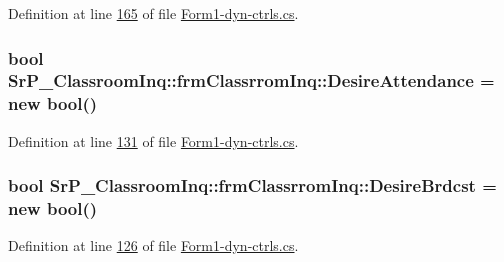 \-Definition at line \hyperlink{_form1-dyn-ctrls_8cs_source_l00165}{165} of file \hyperlink{_form1-dyn-ctrls_8cs_source}{\-Form1-\/dyn-\/ctrls.\-cs}.

\hypertarget{class_sr_p___classroom_inq_1_1frm_classrrom_inq_a2f4a98083518f487399985a1b76d44b5}{
\subsubsection[{\-Desire\-Attendance}]{\setlength{\rightskip}{0pt plus 5cm}bool {\bf \-Sr\-P\-\_\-\-Classroom\-Inq\-::frm\-Classrrom\-Inq\-::\-Desire\-Attendance} = new bool()}}
\label{class_sr_p___classroom_inq_1_1frm_classrrom_inq_a2f4a98083518f487399985a1b76d44b5}


\-Definition at line \hyperlink{_form1-dyn-ctrls_8cs_source_l00131}{131} of file \hyperlink{_form1-dyn-ctrls_8cs_source}{\-Form1-\/dyn-\/ctrls.\-cs}.

\hypertarget{class_sr_p___classroom_inq_1_1frm_classrrom_inq_ab67298a2e18c70080e8cc5e604223679}{
\subsubsection[{\-Desire\-Brdcst}]{\setlength{\rightskip}{0pt plus 5cm}bool {\bf \-Sr\-P\-\_\-\-Classroom\-Inq\-::frm\-Classrrom\-Inq\-::\-Desire\-Brdcst} = new bool()}}
\label{class_sr_p___classroom_inq_1_1frm_classrrom_inq_ab67298a2e18c70080e8cc5e604223679}


\-Definition at line \hyperlink{_form1-dyn-ctrls_8cs_source_l00126}{126} of file \hyperlink{_form1-dyn-ctrls_8cs_source}{\-Form1-\/dyn-\/ctrls.\-cs}.


